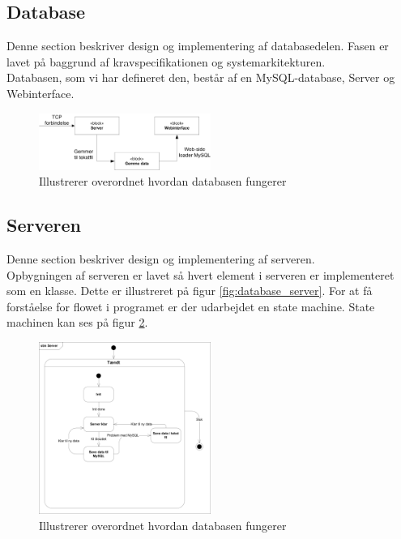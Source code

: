 \subsection{Database}
Denne section beskriver design og implementering af databasedelen. Fasen er lavet på baggrund af kravspecifikationen og systemarkitekturen.\\
Databasen, som vi har defineret den, består af en MySQL-database, Server og Webinterface.

\begin{figure}[H]
\centering
\includegraphics[width = 0.5\textwidth]{billeder/database_to_mysql}
\caption{Illustrerer overordnet hvordan databasen fungerer}
\label{fig:server_to_mysql}
\end{figure}

\subsection{Serveren}
Denne section beskriver design og implementering af serveren.\\
Opbygningen af serveren er lavet så hvert element i serveren er implementeret som en klasse. Dette er illustreret på figur \ref{fig:database_server}. For at få forståelse for flowet i programet er der udarbejdet en state machine. State machinen kan ses på figur \ref{fig:stm_server}.

\begin{figure}[H]
\centering
\includegraphics[width = 0.5\textwidth]{billeder/Systemarkitektur/stm_server}
\caption{Illustrerer overordnet hvordan databasen fungerer}
\label{fig:stm_server}
\end{figure}

